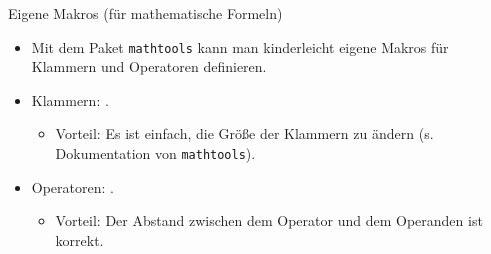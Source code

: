 \begin{frame}{Eigene Makros (für mathematische Formeln)}
    \begin{itemize}
        \item Mit dem Paket \texttt{mathtools} kann man kinderleicht eigene Makros für Klammern und
            Operatoren definieren.
        \item Klammern: .
            \begin{itemize}
                \item Vorteil: Es ist einfach, die Größe der Klammern zu ändern (s. Dokumentation
                    von \texttt{mathtools}).
            \end{itemize}
        \item Operatoren: .
            \begin{itemize}
                \item Vorteil: Der Abstand zwischen dem Operator und dem Operanden ist korrekt.
            \end{itemize}
    \end{itemize}
\end{frame}
